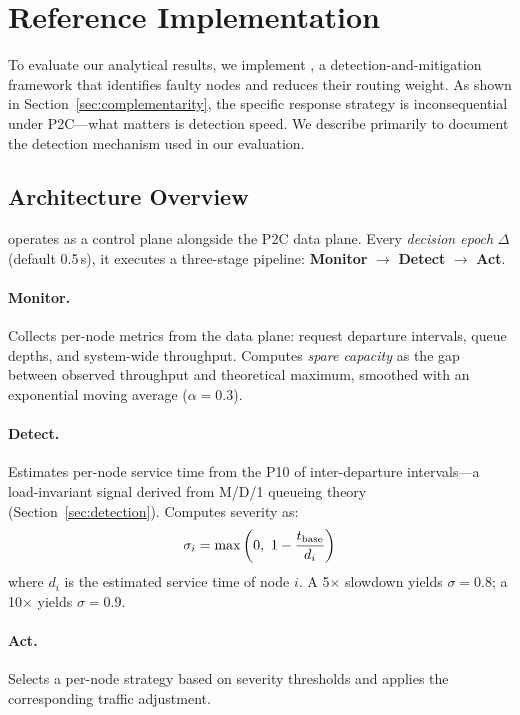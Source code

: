 \section{Reference Implementation}
\label{sec:design}

To evaluate our analytical results, we implement \system{}, a
detection-and-mitigation framework that identifies faulty nodes and
reduces their routing weight. As shown in
Section~\ref{sec:complementarity}, the specific response strategy is
inconsequential under P2C---what matters is detection speed. We
describe \system{} primarily to document the detection mechanism used
in our evaluation.

\subsection{Architecture Overview}

\system{} operates as a control plane alongside the P2C data plane.
Every \emph{decision epoch} $\Delta$ (default 0.5\,s), it executes a
three-stage pipeline: \textbf{Monitor} $\to$ \textbf{Detect} $\to$
\textbf{Act}.

\paragraph{Monitor.}
Collects per-node metrics from the data plane: request departure
intervals, queue depths, and system-wide throughput. Computes
\emph{spare capacity} as the gap between observed throughput and
theoretical maximum, smoothed with an exponential moving average
($\alpha = 0.3$).

\paragraph{Detect.}
Estimates per-node service time from the P10 of inter-departure
intervals---a load-invariant signal derived from M/D/1 queueing theory
(Section~\ref{sec:detection}). Computes severity as:
\begin{equation}
  \sigma_i = \max\left(0,\ 1 - \frac{t_{\text{base}}}{d_i}\right)
  \label{eq:severity}
\end{equation}
where $d_i$ is the estimated service time of node $i$. A 5$\times$
slowdown yields $\sigma = 0.8$; a 10$\times$ yields $\sigma = 0.9$.

\paragraph{Act.}
Selects a per-node strategy based on severity thresholds and applies
the corresponding traffic adjustment.

